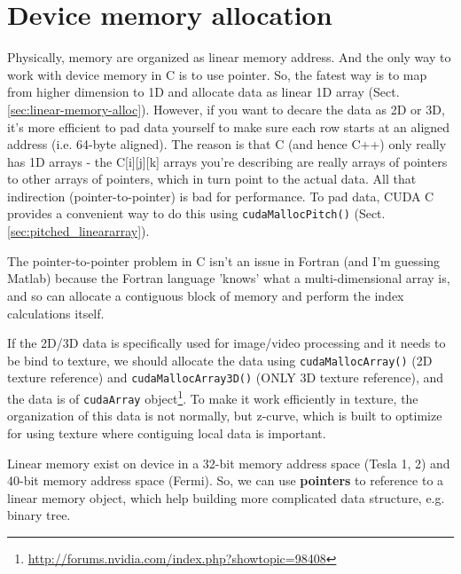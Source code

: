 \section{Device memory allocation}
\label{sec:device-memory-alloc}

Physically, memory are organized as linear memory address. And the only way
to work with device memory in C is to use pointer. So, the fatest way is to
map from higher dimension to 1D and allocate data as linear 1D array
(Sect.\ref{sec:linear-memory-alloc}). However, if you want to decare the
data as 2D or 3D, it's more efficient to pad data yourself to make sure each row
starts at an aligned address (i.e. 64-byte aligned). The reason is that
C (and hence C++) only really has 1D arrays - the C[i][j][k] arrays you're
describing are really arrays of pointers to other arrays of pointers, which in
turn point to the actual data. All that indirection (pointer-to-pointer) is bad
for performance. To pad data, CUDA C provides a convenient way to do this
using \verb!cudaMallocPitch()! (Sect.\ref{sec:pitched_lineararray}).

\begin{framed}
The pointer-to-pointer problem in C isn't an issue in Fortran (and I'm
guessing Matlab) because the Fortran language 'knows' what a multi-dimensional array is, and so can allocate a contiguous
block of memory and perform the index calculations itself.     
\end{framed}

If the 2D/3D data is specifically used for image/video processing and it needs
to be bind to texture, we should allocate the data using
\verb!cudaMallocArray()! (2D texture reference) and \verb!cudaMallocArray3D()! (ONLY 3D texture reference), and the
data is of \verb!cudaArray!
object\footnote{\url{http://forums.nvidia.com/index.php?showtopic=98408}}. To
make it work efficiently in texture, the organization of this data is not
normally, but z-curve, which is built to optimize for using texture where
contiguing local data is important. 

% 

\begin{framed}
Linear memory exist on device in a 32-bit memory address space
  (Tesla 1, 2) and 40-bit memory address space (Fermi). So, we can use
  {\bf pointers} to reference to a linear memory object, which help
  building more complicated data structure, e.g. binary tree. 
\end{framed}

